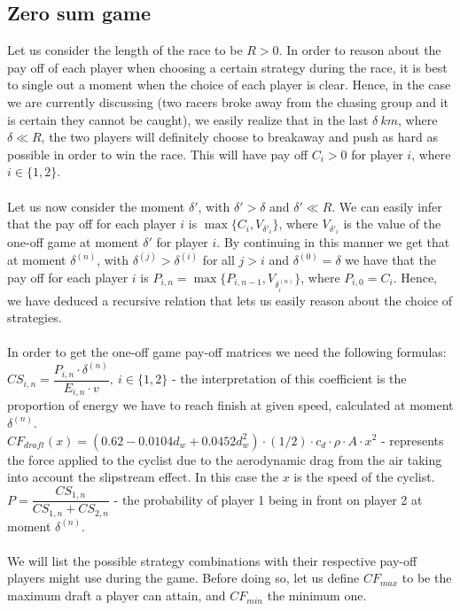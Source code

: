 \documentclass[10pt, a4paper]{report}
\begin{document}
\subsection{Zero sum game}
Let us consider the length of the race to be $R > 0$. In order to reason about the pay off of each player when choosing a certain strategy during the race, it is best to single out a moment when the choice of each player is clear. Hence, in the case we are currently discussing (two racers broke away from the chasing group and it is certain they cannot be caught), we easily realize that in the last $\delta\ km$, where $\delta\ll R$, the two players will definitely choose to breakaway and push as hard as possible in order to win the race. This will have pay off $C_i>0$ for player $i$, where $i \in \{1,2\}$.
\\\\
Let us now consider the moment $\delta'$, with $\delta'>\delta$ and $\delta'\ll R$. We can easily infer that the pay off for each player $i$ is $\max\{C_i,V_{\delta'_i}\}$, where $V_{\delta'_i}$ is the value of the one-off game at moment $\delta'$ for player $i$. By continuing in this manner we get that at moment $\delta^{(n)}$, with $\delta^{(j)}>\delta^{(i)}$ for all $j>i$ and $\delta^{(0)}=\delta$ we have that the pay off for each player $i$ is $P_{i,n} = \max\{P_{i,n-1},V_{\delta^{(n)}_i}\}$, where $P_{i,0} = C_i$. Hence, we have deduced a recursive relation that lets us easily reason about the choice of strategies.
\\\\
In order to get the one-off game pay-off matrices we need the following formulas:\\
$CS_{i,n} = \dfrac{P_{i,n} \cdot \delta^{(n)}}{E_{i,n} \cdot v},\ i\in\{1,2\}$ - the interpretation of this coefficient is the proportion of energy we have to reach finish at given speed, calculated at moment $\delta^(n)$.\\
$CF_{draft}(x)=(0.62 - 0.0104d_w + 0.0452 d_w^2)\cdot (1/2)\cdot c_d\cdot \rho\cdot A\cdot x^2$ -  represents the force applied to the cyclist due to the aerodynamic drag from the air taking into account the slipstream effect. In this case the $x$ is the speed of the cyclist.
$P = \dfrac{CS_{1,n}}{CS_{1,n}+CS_{2,n}}$ - the probability of player 1 being in front on player 2 at moment $\delta^{(n)}$.
\\\\
We will list the possible strategy combinations with their respective pay-off players might use during the game. Before doing so, let us define $CF_{max}$ to be the maximum draft a player can attain, and $CF_{min}$ the minimum one.
\end{document}
